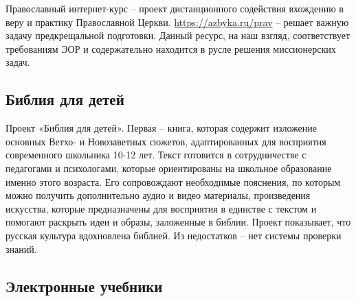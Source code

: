 Православный интернет-курс – проект дистанционного содействия вхождению в веру и практику Православной Церкви. \url{https://azbyka.ru/prav} – решает важную задачу предкрещальной подготовки. Данный ресурс, на наш взгляд, соответствует требованиям ЭОР и содержательно находится в русле решения миссионерских задач.

\subsection{Библия для детей}
Проект «Библия для детей»\cite{biblechild}. Первая – книга, которая содержит изложение основных Ветхо- и Новозаветных сюжетов, адаптированных для восприятия современного школьника 10-12 лет. Текст готовится в сотрудничестве с педагогами и психологами, которые ориентированы на школьное образование именно этого возраста. Его сопровождают необходимые пояснения, по которым можно получить дополнительно аудио и видео материалы, произведения искусства, которые предназначены для восприятия в единстве с текстом и помогают раскрыть идеи и образы, заложенные в библии. Проект показывает, что русская культура вдохновлена библией. Из недостатков – нет системы проверки знаний.


\subsection{Электронные учебники}

